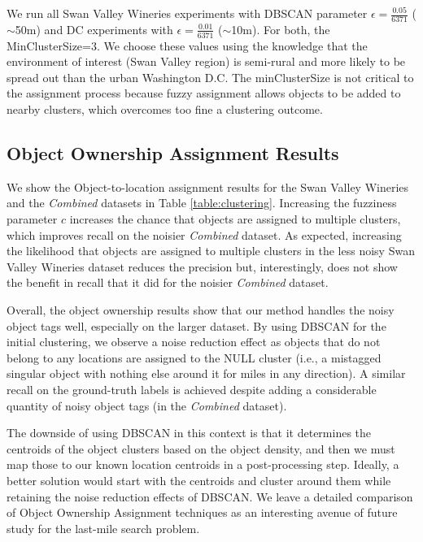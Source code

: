\normalsize

We run all Swan Valley Wineries experiments with DBSCAN parameter $\epsilon = \frac{0.05}{6371}$ ($\sim$50m) and DC experiments with $\epsilon = \frac{0.01}{6371}$ ($\sim$10m). For both, the MinClusterSize=$3$. We choose these values using the knowledge that the environment of interest (Swan Valley region) is semi-rural and more likely to be spread out than the urban Washington D.C. The minClusterSize is not critical to the assignment process because fuzzy assignment allows objects to be added to nearby clusters, which overcomes too fine a clustering outcome. 





\subsection{Object Ownership Assignment Results}
We show the Object-to-location assignment results for the Swan Valley Wineries and the \textit{Combined} datasets in Table \ref{table:clustering}. 
Increasing the fuzziness parameter $c$ increases the chance that objects are assigned to multiple clusters, which improves recall on the noisier \textit{Combined} dataset.
As expected, increasing the likelihood that objects are assigned to multiple clusters in the less noisy Swan Valley Wineries dataset reduces the precision but, interestingly, does not show the benefit in recall that it did for the noisier \textit{Combined} dataset.

Overall, the object ownership results show that our method handles the noisy object tags well, especially on the larger dataset. By using DBSCAN for the initial clustering, we observe a noise reduction effect as objects that do not belong to any locations are assigned to the NULL cluster (i.e., a mistagged singular object with nothing else around it for miles in any direction). A similar recall on the ground-truth labels is achieved despite adding a considerable quantity of noisy object tags (in the \textit{Combined} dataset). 

The downside of using DBSCAN in this context is that it determines the centroids of the object clusters based on the object density, and then we must map those to our known location centroids in a post-processing step. 
Ideally, a better solution would start with the centroids and cluster around them while retaining the noise reduction effects of DBSCAN.
We leave a detailed comparison of Object Ownership Assignment techniques as an interesting avenue of future study for the last-mile search problem.

